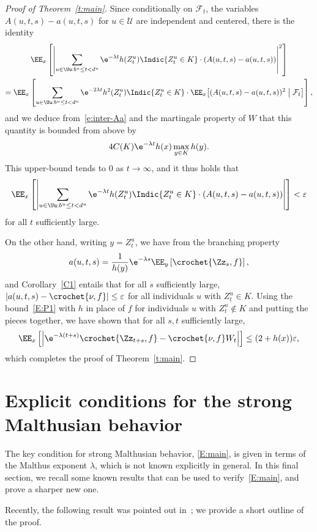 \begin{proof}[Proof of Theorem~\ref{t:main}]
Since conditionally on ${\mathcal F}_t$, the variables $A(u,t,s)-a(u,t,s)$ for $u\in{\mathcal U}$ are independent and centered, there is the identity
\begin{multline*}
\EE_x\left[\left| \sum_{u\in\Uu: b^u\leq t < d^u}\e^{-\lambda t} h(Z^u_t) \Indic{Z^u_t \in K}\cdot (A(u,t,s)-a(u,t,s))\right |^2
\right]\\
= \EE_x\left[\sum_{u\in\Uu: b^u\leq t < d^u}\e^{-2\lambda t} h^2(Z^u_t) \Indic{Z^u_t \in K}\cdot \EE_x\bigl[(A(u,t,s)-a(u,t,s))^2\bigm\vert {\mathcal F}_t\bigr]
\right],
\end{multline*}
and we deduce from~\eqref{e:inter-Aa} and the martingale property of $W$ that this quantity is bounded from above by
\[
4 C(K)\e^{-\lambda t} h(x) \max_{y\in K} h(y).
\]
This upper-bound tends to $0$ as $t\to \infty$, and it thus holds that
\[
\EE_x\left[\left| \sum_{u\in\Uu: b^u\leq t < d^u}\e^{-\lambda t} h(Z^u_t) \Indic{Z^u_t \in K}\cdot (A(u,t,s)-a(u,t,s))\right |
\right]< \varepsilon
\]
for all $t$ sufficiently large.

On the other hand, writing $y=Z^u_t$, we have from the branching property
\[
a(u,t,s)= \frac{1}{h(y)} \e^{-\lambda s} \EE_{y} \left[\crochet{\Zz_{s},f}\right],
\]
and Corollary~\ref{C1} entails that for all $s$ sufficiently large, $|a(u,t,s)-\crochet{\nu,f}|\leq \varepsilon$ for all individuals $u$ with $Z^u_t\in K$. Using the bound~\eqref{E:P1} with $h$ in place of $f$ for individuals $u$ with $Z^u_t\not \in K$ and putting the pieces together, we have shown that for all $s, t$ sufficiently large,
\[
\EE_x\left[\left| \e^{-\lambda (t+s)}\crochet{\Zz_{t+s},f} - \crochet{\nu,f} W_t
\right | \right] \leq (2+h(x))\varepsilon,
\]
which completes the proof of Theorem~\ref{t:main}.
\end{proof}


\section{Explicit conditions for the strong Malthusian behavior}\label{section6}

The key condition for strong Malthusian behavior, \eqref{E:main}, is given in terms of the Malthus exponent $\lambda$, which is not known explicitly in general. In this final section, we recall some known results that can be used to verify~\eqref{E:main}, and prove a sharper new one.

Recently, the following result was pointed out in~\cite{BeFK}; we provide a short outline of the proof.



